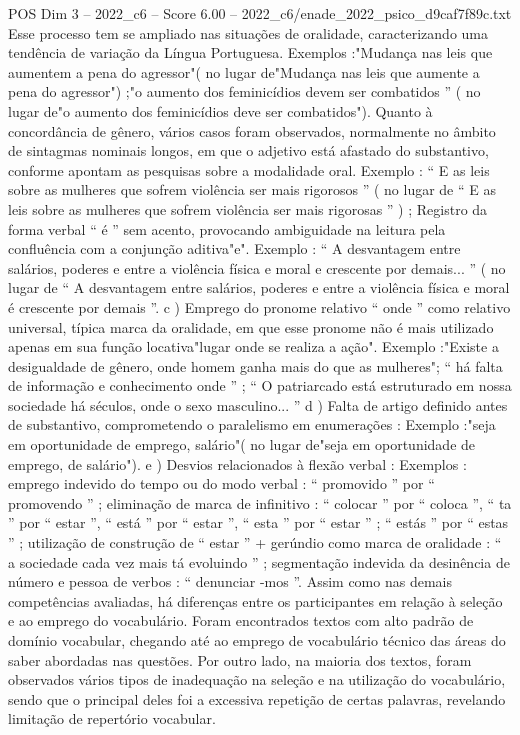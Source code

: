 \begin{textsample}{POS Dim 3 – 2022\_c6 – Score 6.00 – 2022\_c6/enade\_2022\_psico\_d9caf7f89c.txt}
Esse processo tem se ampliado nas situações de oralidade, caracterizando uma tendência de variação da Língua Portuguesa.
Exemplos :"Mudança nas leis que aumentem a pena do agressor"( no lugar de"Mudança nas leis que aumente a pena do agressor") ;"o aumento dos feminicídios devem ser combatidos ” ( no lugar de"o aumento dos feminicídios deve ser combatidos").
Quanto à concordância de gênero, vários casos foram observados, normalmente no âmbito de sintagmas nominais longos, em que o adjetivo está afastado do substantivo, conforme apontam as pesquisas sobre a modalidade oral.
Exemplo : “ E as leis sobre as mulheres que sofrem violência ser mais rigorosos ” ( no lugar de “ E as leis sobre as mulheres que sofrem violência ser mais rigorosas ” ) ; Registro da forma verbal “ é ” sem acento, provocando ambiguidade na leitura pela confluência com a conjunção aditiva"e".
Exemplo : “ A desvantagem entre salários, poderes e entre a violência física e moral e crescente por demais... ” ( no lugar de “ A desvantagem entre salários, poderes e entre a violência física e moral é crescente por demais ”. c ) Emprego do pronome relativo “ onde ” como relativo universal, típica marca da oralidade, em que esse pronome não é mais utilizado apenas em sua função locativa"lugar onde se realiza a ação".
Exemplo :"Existe a desigualdade de gênero, onde homem ganha mais do que as mulheres"; “ há falta de informação e conhecimento onde ” ; “ O patriarcado está estruturado em nossa sociedade há séculos, onde o sexo masculino... ” d ) Falta de artigo definido antes de substantivo, comprometendo o paralelismo em enumerações : Exemplo :"seja em oportunidade de emprego, salário"( no lugar de"seja em oportunidade de emprego, de salário"). e ) Desvios relacionados à flexão verbal : Exemplos : emprego indevido do tempo ou do modo verbal : “ promovido ” por “ promovendo ” ; eliminação de marca de infinitivo : “ colocar ” por “ coloca ”, “ ta ” por “ estar ”, “ está ” por “ estar ”, “ esta ” por “ estar ” ; “ estás ” por “ estas ” ; utilização de construção de “ estar ” + gerúndio como marca de oralidade : “ a sociedade cada vez mais tá evoluindo ” ; segmentação indevida da desinência de número e pessoa de verbos : “ denunciar -mos ”.
Assim como nas demais competências avaliadas, há diferenças entre os participantes em relação à seleção e ao emprego do vocabulário.
Foram encontrados textos com alto padrão de domínio vocabular, chegando até ao emprego de vocabulário técnico das áreas do saber abordadas nas questões.
Por outro lado, na maioria dos textos, foram observados vários tipos de inadequação na seleção e na utilização do vocabulário, sendo que o principal deles foi a excessiva repetição de certas palavras, revelando limitação de repertório vocabular.

\end{textsample}
